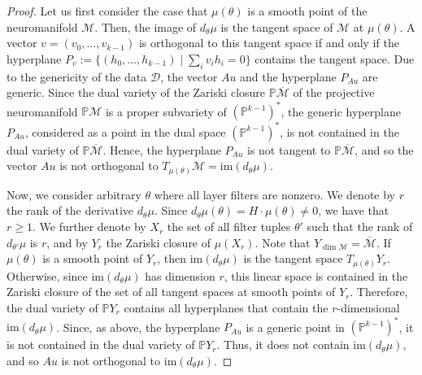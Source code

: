 \documentclass[twoside]{article}
\theoremstyle{definition}
\theoremstyle{remark}
\begin{document}
\begin{proof}
    Let us first consider the case that $\mu(\theta)$ is a smooth point of the neuromanifold $\mathcal{M}$.
    Then, the image of $d_\theta \mu$ is the tangent space of $\mathcal{M}$ at $\mu(\theta)$.
    A vector $v=(v_0, \ldots, v_{k-1})$ is orthogonal to this tangent space if and only if the hyperplane 
    $P_v := \{ (h_0, \ldots, h_{k-1}) \mid \sum_i v_i h_i=0 \}$ contains the tangent space.
    Due to the genericity of the data $\mathcal{D}$, the vector $Au$ and the hyperplane $P_{Au}$ are generic. 
    Since the dual variety of the Zariski closure $\mathbb{P}\overline{\mathcal{M}}$ of the projective neuromanifold $\mathbb{P}\mathcal{M}$ is a proper subvariety of $(\mathbb{P}^{k-1})^\ast$, the generic hyperplane $P_{Au}$, considered as a point in the dual space $(\mathbb{P}^{k-1})^\ast$, is not contained in the dual variety of $\mathbb{P}\overline{\mathcal{M}}$.
    Hence, the hyperplane $P_{Au}$ is not tangent to $\mathbb{P}\overline{\mathcal{M}}$, and so the vector $Au$ is not orthogonal 
    to $T_{\mu(\theta)} \mathcal{M} = \mathrm{im}(d_\theta \mu)$.
    
    Now, we consider  arbitrary $\theta$ where all layer filters are nonzero.
    We denote by $r$ the rank of the derivative $d_\theta \mu$.
    Since $d_\theta \mu (\theta) = H \cdot  \mu(\theta) \neq 0$, we have that $r \geq 1$.
    We further denote by $X_r$ the set of all filter tuples $\theta'$ such that the rank of $d_{\theta'}\mu$ is $r$, and by $Y_r$ the Zariski closure of $\mu(X_r)$.
    Note that $Y_{\dim \mathcal{M}} = \overline{\mathcal{M}}$.
    If $\mu(\theta)$ is a smooth point of $Y_r$, then $\mathrm{im}(d_\theta \mu)$ is the tangent space $T_{\mu(\theta)} Y_r$.
    Otherwise, since $\mathrm{im}(d_\theta \mu)$ has dimension $r$, this linear space is contained in the Zariski closure of the set of all tangent spaces at smooth points of $Y_r$.
    Therefore, the dual variety of $\mathbb{P} Y_r$ contains all hyperplanes that contain the $r$-dimensional $\mathrm{im}(d_\theta \mu)$.
    Since, as above, the hyperplane $P_{Au}$ is a generic point in $(\mathbb{P}^{k-1})^\ast$, it is not contained in the dual variety of $\mathbb{P} Y_r$.
    Thus, it does not contain $\mathrm{im}(d_\theta \mu)$, and so $Au$ is not orthogonal to $\mathrm{im}(d_\theta \mu)$.
\end{proof}
\end{document}
